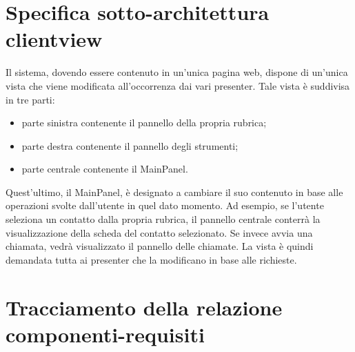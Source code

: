 \clearpage

\section{Specifica sotto-architettura clientview}\label{sec:clientviewarchitecture}
Il sistema, dovendo essere contenuto in un'unica pagina web, dispone di un'unica vista che viene modificata all'occorrenza dai vari presenter. Tale vista è suddivisa in tre parti:
\begin{itemize}
\item parte sinistra contenente il pannello della propria rubrica;
\item parte destra contenente il pannello degli strumenti;
\item parte centrale contenente il MainPanel.
\end{itemize}
Quest'ultimo, il MainPanel, è designato a cambiare il suo contenuto in base alle operazioni svolte dall'utente in quel dato momento. Ad esempio, se l'utente seleziona un contatto dalla propria rubrica, il pannello centrale conterrà la visualizzazione della scheda del contatto selezionato. Se invece avvia una chiamata, vedrà visualizzato il pannello delle chiamate. La vista è quindi demandata tutta ai presenter che la modificano in base alle richieste.
\clearpage

\section{Tracciamento della relazione componenti-requisiti}



